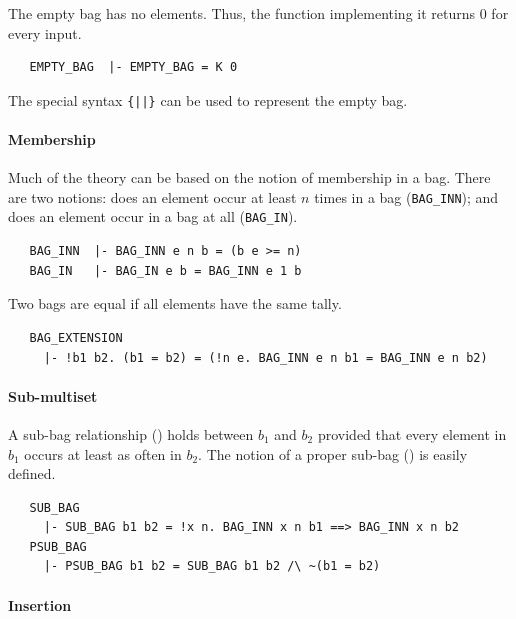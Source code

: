 The empty bag has no elements. Thus, the function implementing it
returns $0$ for every input.
%
\begin{hol}
\begin{verbatim}
   EMPTY_BAG  |- EMPTY_BAG = K 0
\end{verbatim}
\end{hol}

\noindent The special syntax {\verb+{||}+} can be used to represent the empty
bag.

\paragraph {Membership}

Much of the theory can be based on the notion of membership in a
bag. There are two notions: does an element occur at least $n$ times
in a bag ({\small\verb+BAG_INN+}); and does an element occur in a bag
at all ({\small\verb+BAG_IN+}).
%
\begin{hol}
\begin{verbatim}
   BAG_INN  |- BAG_INN e n b = (b e >= n)
   BAG_IN   |- BAG_IN e b = BAG_INN e 1 b
\end{verbatim}
\end{hol}
%
Two bags are equal if all elements have the same tally.
%
\begin{hol}
\begin{verbatim}
   BAG_EXTENSION
     |- !b1 b2. (b1 = b2) = (!n e. BAG_INN e n b1 = BAG_INN e n b2)
\end{verbatim}
\end{hol}

\paragraph{Sub-multiset}

A sub-bag relationship () holds between $b_1$ and
$b_2$ provided that every element in $b_1$ occurs at least as often in
$b_2$. The notion of a proper sub-bag () is easily
defined.
%
\begin{hol}
\begin{verbatim}
   SUB_BAG
     |- SUB_BAG b1 b2 = !x n. BAG_INN x n b1 ==> BAG_INN x n b2
   PSUB_BAG
     |- PSUB_BAG b1 b2 = SUB_BAG b1 b2 /\ ~(b1 = b2)
\end{verbatim}
\end{hol}

\paragraph{Insertion}

